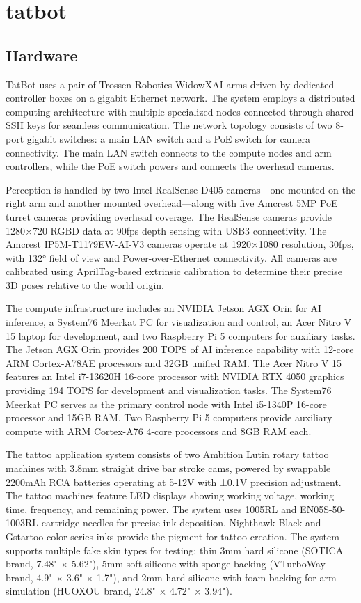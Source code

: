 \documentclass[11pt]{article}
\begin{document}
\pagebreak

\section{tatbot}

\subsection{Hardware}

TatBot uses a pair of Trossen Robotics WidowXAI arms driven by dedicated controller boxes on a gigabit Ethernet network.
The system employs a distributed computing architecture with multiple specialized nodes connected through shared SSH keys for seamless communication.
The network topology consists of two 8-port gigabit switches: a main LAN switch and a PoE switch for camera connectivity.
The main LAN switch connects to the compute nodes and arm controllers, while the PoE switch powers and connects the overhead cameras.

Perception is handled by two Intel RealSense D405 cameras---one mounted on the right arm and another mounted overhead---along with five Amcrest 5MP PoE turret cameras providing overhead coverage.
The RealSense cameras provide 1280×720 RGBD data at 90fps depth sensing with USB3 connectivity.
The Amcrest IP5M-T1179EW-AI-V3 cameras operate at 1920×1080 resolution, 30fps, with 132° field of view and Power-over-Ethernet connectivity.
All cameras are calibrated using AprilTag-based extrinsic calibration to determine their precise 3D poses relative to the world origin.

The compute infrastructure includes an NVIDIA Jetson AGX Orin for AI inference, a System76 Meerkat PC for visualization and control, an Acer Nitro V 15 laptop for development, and two Raspberry Pi 5 computers for auxiliary tasks.
The Jetson AGX Orin provides 200 TOPS of AI inference capability with 12-core ARM Cortex-A78AE processors and 32GB unified RAM.
The Acer Nitro V 15 features an Intel i7-13620H 16-core processor with NVIDIA RTX 4050 graphics providing 194 TOPS for development and visualization tasks.
The System76 Meerkat PC serves as the primary control node with Intel i5-1340P 16-core processor and 15GB RAM.
Two Raspberry Pi 5 computers provide auxiliary compute with ARM Cortex-A76 4-core processors and 8GB RAM each.

The tattoo application system consists of two Ambition Lutin rotary tattoo machines with 3.8mm straight drive bar stroke cams, powered by swappable 2200mAh RCA batteries operating at 5-12V with ±0.1V precision adjustment.
The tattoo machines feature LED displays showing working voltage, working time, frequency, and remaining power.
The system uses 1005RL and EN05S-50-1003RL cartridge needles for precise ink deposition.
Nighthawk Black and Gstartoo color series inks provide the pigment for tattoo creation.
The system supports multiple fake skin types for testing: thin 3mm hard silicone (SOTICA brand, 7.48" × 5.62"), 5mm soft silicone with sponge backing (VTurboWay brand, 4.9" × 3.6" × 1.7"), and 2mm hard silicone with foam backing for arm simulation (HUOXOU brand, 24.8" × 4.72" × 3.94").
\end{document}
